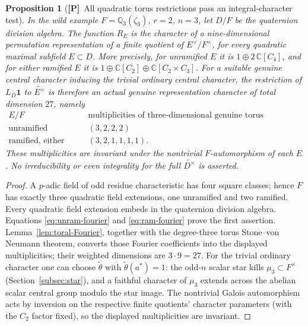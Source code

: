 \documentclass[11pt]{article}
\newcommand{\Ptag}{\textnormal{\textbf{[P]}}}
\theoremstyle{plain}
\newtheorem{proposition}[theorem]{Proposition}
\theoremstyle{definition}
\begin{document}
\begin{proposition}[\Ptag\ All quadratic torus restrictions pass
an integral-character test]\label{prop:all-three-tori}
In the wild example $F=\mathbb Q_3(\zeta_3)$, $r=2$, $n=3$,
let $D/F$ be the quaternion division algebra.  The function
$R_E$ is the character of a nine-dimensional permutation
representation of a finite quotient of $E^\times/F^\times$,
for every quadratic maximal subfield $E\subset D$.
More precisely, for unramified $E$ it is
$1\oplus 2\,\mathbb C[C_4]$, and for either ramified $E$
it is $1\oplus\mathbb C[C_2]\oplus\mathbb C[C_2\times C_3]$.
For a suitable genuine central character inducing the trivial
ordinary central character, the restriction of $L_D\mathbf1$
to $\widetilde{E^\times}$ is therefore an \emph{actual genuine
representation character} of total dimension $27$, namely
\[
 \begin{array}{c|c}
 E/F&\text{multiplicities of three-dimensional genuine torus irreducibles}\\\hline
 \text{unramified}&(3,2,2,2)\\
 \text{ramified, either type}&(3,2,1,1,1,1).
 \end{array}
\]
These multiplicities are invariant under the nontrivial
$F$-automorphism of each $E$.
\emph{No irreducibility or even integrality for the full
$\widetilde{D^\times}$ is asserted.}
\end{proposition}
\begin{proof}
A $p$-adic field of odd residue characteristic has four
square classes; hence $F$ has exactly three quadratic field
extensions, one unramified and two ramified.  Every quadratic
field extension embeds in the quaternion division algebra.
Equations \eqref{eq:unram-fourier} and \eqref{eq:ram-fourier}
prove the first assertion.  Lemma~\ref{lem:toral-Fourier},
together with the degree-three torus Stone--von Neumann theorem,
converts those Fourier coefficients into the displayed
multiplicities; their weighted dimensions are $3\cdot9=27$.
For the trivial ordinary character one can choose
$\widetilde\theta$ with $\widetilde\theta(a^*)=1$:
the odd-$n$ scalar star kills $\mu_3\subset F^\times$
(Section~\ref{subsec:star}), and a faithful character of
$\mu_3$ extends across the abelian scalar central group
modulo the star image.  The nontrivial Galois automorphism
acts by inversion on the respective finite quotients' character
parameters (with the $C_2$ factor fixed), so the displayed
multiplicities are invariant.
\end{proof}
\end{document}
